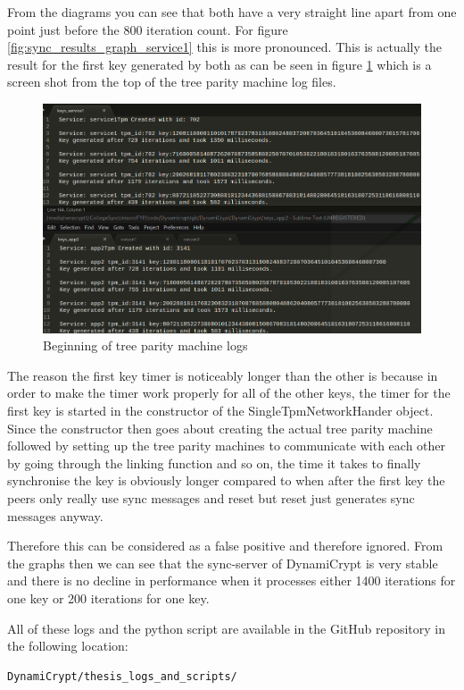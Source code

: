 From the diagrams you can see that both have a very straight line apart from one point just before the 800 iteration count. For figure \ref{fig:sync_results_graph_service1} this is more pronounced. This is actually the result for the first key generated by both as can be seen in figure \ref{fig:sync13} which is a screen shot from the top of the tree parity machine log files.

\begin{figure}[!h]
	\centering
	\includegraphics[width=1\textwidth]{Figures/sync13.png}
	\caption[Beginning of tree parity machine logs]{Beginning of tree parity machine logs}
	\label{fig:sync13}
\end{figure}
\FloatBarrier

The reason the first key timer is noticeably longer than the other is because in order to make the timer work properly for all of the other keys, the timer for the first key is started in the constructor of the SingleTpmNetworkHander object. Since the constructor then goes about creating the actual tree parity machine followed by setting up the tree parity machines to communicate with each other by going through the linking function and so on, the time it takes to finally synchronise the key is obviously longer compared to when after the first key the peers only really use sync messages and reset but reset just generates sync messages anyway. 

Therefore this can be considered as a false positive and therefore ignored. From the graphs then we can see that the sync-server of DynamiCrypt is very stable and there is no decline in performance when it processes either 1400 iterations for one key or 200 iterations for one key.

All of these logs and the python script are available in the GitHub repository in the following location:
\begin{lstlisting}
DynamiCrypt/thesis_logs_and_scripts/
\end{lstlisting}


